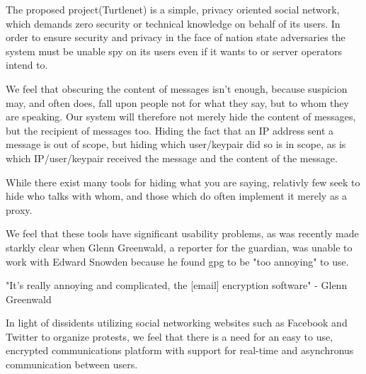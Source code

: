 The proposed project(Turtlenet) is a simple, privacy oriented social
network, which demands zero security or technical knowledge on behalf of its
users. In order to ensure security and privacy in the face of nation state
adversaries the system must be unable spy on its users even if it wants to or
server operators intend to.

We feel that obscuring the content of messages isn't enough, because suspicion
may, and often does, fall upon people not for what they say, but to whom they
are speaking. Our system will therefore not merely hide
the content of messages, but the recipient of messages too. Hiding the fact that
an IP address sent a message is out of scope, but hiding which user/keypair did
so is in scope, as is which IP/user/keypair received the message and the content
of the message.

While there exist many tools for hiding what you are saying, relativly few seek
to hide who talks with whom, and those which do often implement it merely as a proxy.

We feel that these tools have significant usability problems, as was recently
made starkly clear when Glenn Greenwald, a reporter for the guardian, was unable
to work with Edward Snowden because he found gpg to be "too annoying" to use.

"It’s really annoying and complicated, the [email] encryption software" - Glenn
Greenwald \cite{greenwald_annoying}

In light of dissidents utilizing social networking websites such as Facebook and
Twitter to organize protests, we feel that there is a need for an easy to use,
encrypted communications platform with support for real-time and asynchronus
communication between users.
